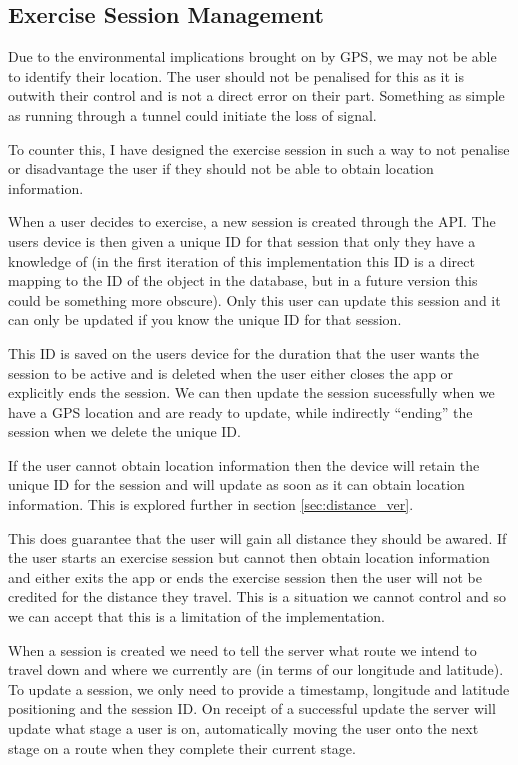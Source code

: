 \subsection{Exercise Session Management}
\label{sec:session_mgmt}
Due to the environmental implications brought on by GPS, we may not be
able to identify their location. The user should not
be penalised for this as it is outwith their control and is not a
direct error on their part. Something as simple as running through a
tunnel could initiate the loss of signal. 

To counter this, I have designed the exercise session in such a way to
not penalise or disadvantage the user if they should not be able to
obtain location information. 

When a user decides to exercise, a new session is created through the
API. The users device is then given a unique ID for that session that
only they have a knowledge of (in the first iteration of this
implementation this ID is a direct mapping to the ID of the object in
the database, but in a future version this could be something more
obscure). Only this user can update this session and it can only be
updated if you know the unique ID for that session. 

This ID is saved on the users device for the duration that the user
wants the session to be active and is deleted when the user either
closes the app or explicitly ends the session. We can then update the
session sucessfully when we have a GPS location and are ready to
update, while indirectly ``ending'' the session when we delete the
unique ID.

If the user cannot obtain location information then the device will
retain the unique ID for the session and will update as soon as it can
obtain location information. This is explored further in section
\ref{sec:distance_ver}.

This does guarantee that the user will gain all distance they should
be awared. If the user starts an exercise session but cannot then
obtain location information and either exits the app or ends the
exercise session then the user will not be credited for the distance
they travel. This is a situation we cannot control and so we can
accept that this is a limitation of the implementation.

When a session is created we need to tell the server what route we
intend to travel down and where we currently are (in terms of our
longitude and latitude). To update a session, we only need to provide
a timestamp, longitude and latitude positioning and the session
ID. On receipt of a successful update the server will update what
stage a user is on, automatically moving the user onto the next stage
on a route when they complete their current stage. 

